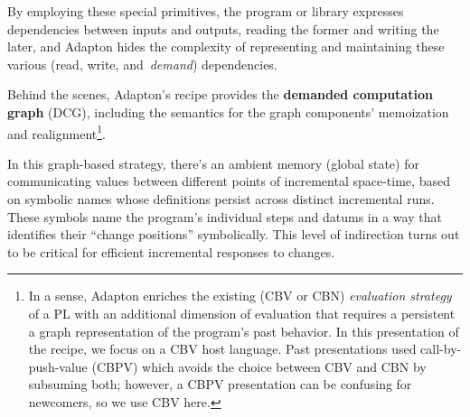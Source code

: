 \documentclass[11pt]{article}
\begin{document}
\begin{center}
\end{center}

\noindent
By employing these special primitives, the program or library
expresses dependencies between inputs and outputs, reading the former
and writing the later, and Adapton hides the complexity of
representing and maintaining these various (read, write,
and~\emph{demand}) dependencies.

Behind the scenes, Adapton's recipe provides the \textbf{demanded computation graph} (DCG),
including the semantics for the graph components'
memoization and realignment\footnote{
In a sense, Adapton enriches the existing (CBV or CBN)
\emph{evaluation strategy} of a PL with an additional dimension of
evaluation that requires a persistent a graph representation of the
program's past behavior.
%
In this presentation of the recipe, we focus on a CBV host language.
%
Past presentations used call-by-push-value (CBPV) which avoids the
choice between CBV and CBN by subsuming both; however, a CBPV
presentation can be confusing for newcomers, so we use CBV here.
}.

In this graph-based strategy, there's an ambient memory (global state)
for communicating values between different points of incremental
space-time, based on symbolic names whose definitions persist across
distinct incremental runs.
%
These symbols name the program's individual steps and datums in a way
that identifies their ``change positions'' symbolically.
%
This level of indirection turns out to be critical for efficient
incremental responses to changes.
\end{document}
